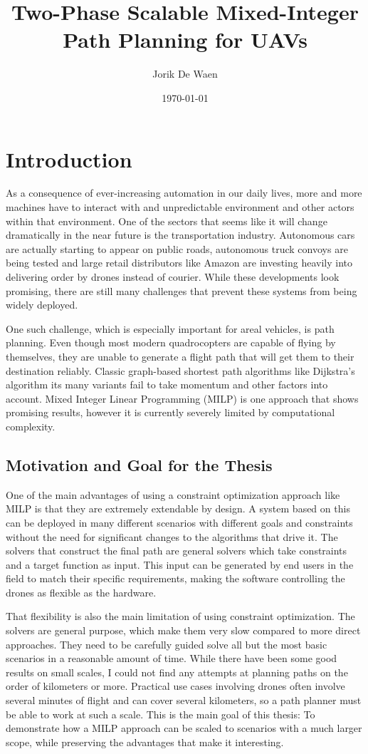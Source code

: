 \documentclass[12pt]{article}
\title{Two-Phase Scalable Mixed-Integer Path Planning for UAVs}
\author{Jorik De Waen}
\date{\today}
\begin{document}
\maketitle

\section{Introduction}
As a consequence of ever-increasing automation in our daily lives, more and more machines have to interact with and unpredictable environment and other actors within that environment. One of the sectors that seems like it will change dramatically in the near future is the transportation industry. Autonomous cars are actually starting to appear on public roads, autonomous truck convoys are being tested and large retail distributors like Amazon are investing heavily into delivering order by drones instead of courier. While these developments look promising, there are still many challenges that prevent these systems from being widely deployed.
\par
One such challenge, which is especially important for areal vehicles, is path planning. Even though most modern quadrocopters are capable of flying by themselves, they are unable to generate a flight path that will get them to their destination reliably. Classic graph-based shortest path algorithms like Dijkstra's algorithm its many variants fail to take momentum and other factors into account. Mixed Integer Linear Programming (MILP) is one approach that shows promising results, however it is currently severely limited by computational complexity.



\newpage
\subsection{Motivation and Goal for the Thesis}
One of the main advantages of using a constraint optimization approach like MILP is that they are extremely extendable by design. A system based on this can be deployed in many different scenarios with different goals and constraints without the need for significant changes to the algorithms that drive it. The solvers that construct the final path are general solvers which take constraints and a target function as input. This input can be generated by end users in the field to match their specific requirements, making the software controlling the drones as flexible as the hardware.
\par
That flexibility is also the main limitation of using constraint optimization. The solvers are general purpose, which make them very slow compared to more direct approaches. They need to be carefully guided solve all but the most basic scenarios in a reasonable amount of time. While there have been some good results on small scales, I could not find any attempts at planning paths on the order of kilometers or more. Practical use cases involving drones often involve several minutes of flight and can cover several kilometers, so a path planner must be able to work at such a scale. This is the main goal of this thesis: To demonstrate how a MILP approach can be scaled to scenarios with a much larger scope, while preserving the advantages that make it interesting.
\end{document}
